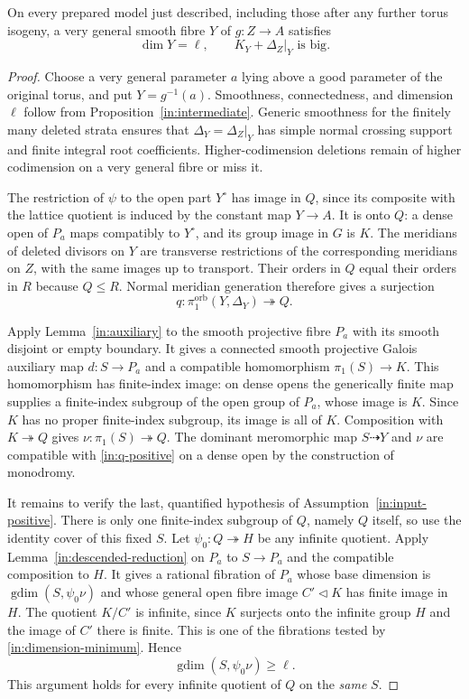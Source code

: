 \begin{proposition}\label{in:fibre-big}
On every prepared model just described, including those after any
further torus isogeny, a very general smooth fibre $Y$ of $g:Z\to A$
satisfies
\[
 \dim Y=\ell,
 \qquad K_Y+\Delta_Z|_Y\text{ is big}.
\]
\end{proposition}

\begin{proof}
Choose a very general parameter $a$ lying above a good parameter of
the original torus, and put $Y=g^{-1}(a)$. Smoothness, connectedness, and dimension
$\ell$ follow from Proposition~\ref{in:intermediate}.  Generic
smoothness for the finitely many deleted strata ensures that
$\Delta_Y=\Delta_Z|_Y$ has simple normal crossing support and finite
integral root coefficients.  Higher-codimension deletions remain of
higher codimension on a very general fibre or miss it.

The restriction of $\psi$ to the open part $Y^\circ$ has image in
$Q$, since its composite with the lattice quotient is induced by the
constant map $Y\to A$.  It is onto $Q$: a dense open of $P_a$ maps
compatibly to $Y^\circ$, and its group image in $G$ is $K$.
The meridians of deleted divisors on $Y$ are transverse restrictions
of the corresponding meridians on $Z$, with the same images up to
transport.  Their orders in $Q$ equal their orders in $R$ because
$Q\le R$.  Normal meridian generation therefore gives a surjection
\begin{equation}\label{in:q-positive}
 q:\pi_1^{\mathrm{orb}}(Y,\Delta_Y)\twoheadrightarrow Q.
\end{equation}

Apply Lemma~\ref{in:auxiliary} to the smooth projective fibre $P_a$
with its smooth disjoint or empty boundary.  It gives a connected
smooth projective Galois auxiliary map $d:S\to P_a$ and a compatible
homomorphism $\pi_1(S)\to K$.  This homomorphism has finite-index
image: on dense opens the generically finite map supplies a
finite-index subgroup of the open group of $P_a$, whose image is
$K$.  Since $K$ has no proper finite-index subgroup, its image is
all of $K$.  Composition with $K\twoheadrightarrow Q$ gives
$\nu:\pi_1(S)\twoheadrightarrow Q$.  The dominant meromorphic map
$S\dashrightarrow Y$ and $\nu$ are compatible with
\eqref{in:q-positive} on a dense open by the construction of
monodromy.

It remains to verify the last, quantified hypothesis of
Assumption~\ref{in:input-positive}.  There is only one finite-index
subgroup of $Q$, namely $Q$ itself, so use the identity cover of this
fixed $S$.  Let $\psi_0:Q\twoheadrightarrow H$ be any infinite
quotient.  Apply Lemma~\ref{in:descended-reduction} on $P_a$ to
$S\to P_a$ and the compatible composition to $H$.  It gives a
rational fibration of $P_a$ whose base dimension is
$\operatorname{gdim}(S,\psi_0\nu)$ and whose general open fibre
image $C'\triangleleft K$ has finite image in $H$.  The quotient
$K/C'$ is infinite, since $K$ surjects onto the infinite group $H$
and the image of $C'$ there is finite.  This is one of the fibrations
tested by \eqref{in:dimension-minimum}.  Hence
\[
 \operatorname{gdim}(S,\psi_0\nu)\ge\ell.
\]
This argument holds for every infinite quotient of $Q$ on the
\emph{same} $S$.


\end{proof}
